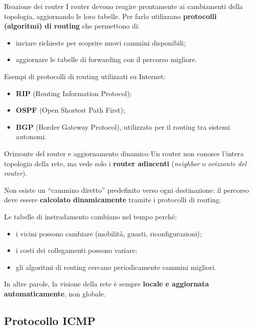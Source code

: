 \documentclass[a4paper,12pt]{report}
\begin{document}
\begin{notebox}{Reazione dei router}
I router devono reagire prontamente ai cambiamenti della topologia, aggiornando le loro tabelle.
Per farlo utilizzano \textbf{protocolli (algoritmi) di routing} che permettono di:
\begin{itemize}
    \item inviare richieste per scoprire nuovi cammini disponibili;
    \item aggiornare le tabelle di forwarding con il percorso migliore.
\end{itemize}
\end{notebox}

Esempi di protocolli di routing utilizzati su Internet:
\begin{itemize}
    \item \textbf{RIP} (Routing Information Protocol);
    \item \textbf{OSPF} (Open Shortest Path First);
    \item \textbf{BGP} (Border Gateway Protocol), utilizzato per il routing tra sistemi autonomi.
\end{itemize}
\begin{notebox}{Orizzonte del router e aggiornamento dinamico}
Un router non conosce l’intera topologia della rete, ma vede solo i \textbf{router adiacenti} (\textit{neighbor} o \textit{orizzonte del router}).  

Non esiste un “cammino diretto” predefinito verso ogni destinazione: il percorso deve essere
\textbf{calcolato dinamicamente} tramite i protocolli di routing.

Le tabelle di instradamento cambiano nel tempo perché:
\begin{itemize}
    \item i vicini possono cambiare (mobilità, guasti, riconfigurazioni);
    \item i costi dei collegamenti possono variare;
    \item gli algoritmi di routing cercano periodicamente cammini migliori.
\end{itemize}
In altre parole, la visione della rete è sempre \textbf{locale e aggiornata automaticamente}, non globale.
\end{notebox}

\vspace{2cm}
\subsection{Protocollo  ICMP }
\end{document}
